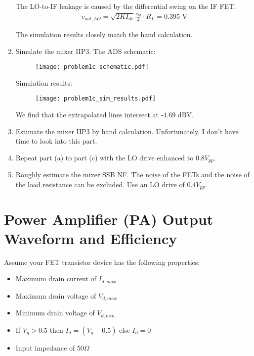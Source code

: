 \begin{enumerate}[label=(\alph*)]
    The LO-to-IF leakage is caused by the differential swing on the IF FET.
    \begin{align*}
        v_{out,LO} = \sqrt{2 K I_{dc}} \frac{v_{id}}{2} \cdot R_L = 0.395 \text{ V}
    \end{align*}

    The simulation results closely match the hand calculation.

    \item {\color{blue} Simulate the mixer IIP3.}
    The ADS schematic:
    \begin{figure}[H]
        \centering \texttt{[image: problem1c\_schematic.pdf]}
    \end{figure}

    Simulation results:
    \begin{figure}[H]
        \centering \texttt{[image: problem1c\_sim\_results.pdf]}
    \end{figure}

    We find that the extrapolated lines intersect at -4.69 dBV.

    \item {\color{blue} Estimate the mixer IIP3 by hand calculation.}
    Unfortunately, I don't have time to look into this part.

    \item {\color{blue} Repeat part (a) to part (c) with the LO drive enhanced to 0.8$V_{pp}$.}

    \item {\color{blue} Roughly estimate the mixer SSB NF. The noise of the FETs and the noise of the load resistance can be excluded. Use an LO drive of 0.4$V_{pp}$.}
\end{enumerate}

\section{Power Amplifier (PA) Output Waveform and Efficiency}
{\color{blue} Assume your FET transistor device has the following properties:
\begin{itemize}
    \item Maximum drain current of $I_{d,max}$
    \item Maximum drain voltage of $V_{d,max}$
    \item Minimum drain voltage of $V_{d,min}$
    \item If $V_g > 0.5$ then $I_d = (V_g - 0.5)$ else $I_d = 0$
    \item Input impedance of $50 \Omega$
\end{itemize}}

